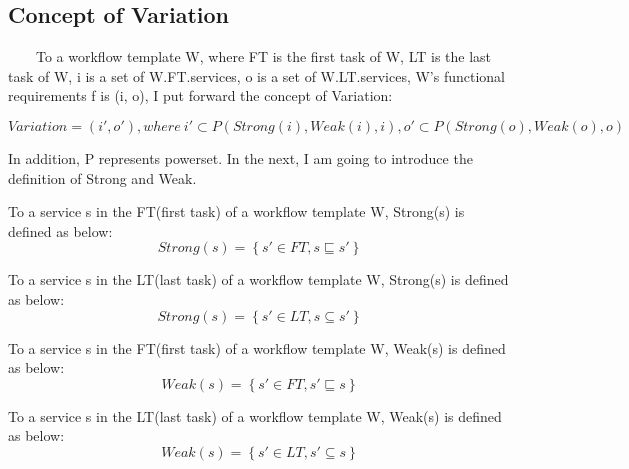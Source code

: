 \documentclass[senior,final,11pt]{iscs-thesis}
\begin{document}
\subsection{Concept of Variation}



~~~~To a workflow template W,  where  FT is the first task of W, LT is the last task of W, i is a set of W.FT.services, o is a set of W.LT.services, W's functional requirements f is (i, o), I put forward the concept of Variation:

\[Variation = (i', o'), where~i' \subset P(Strong(i), Weak(i), i),  o' \subset P(Strong(o), Weak(o), o)\]

In addition, P represents powerset. In the next, I am going to introduce the definition of Strong and Weak.


To a service s in the FT(first task) of a workflow template W, Strong(s) is defined as below:
\[Strong(s) = \left\{s' \in FT, s \sqsubseteq s'\right\}\]

To a service s in the LT(last task) of a workflow template W, Strong(s) is defined as below:
\[Strong(s) = \left\{s' \in LT, s \subseteq s'\right\}\]

To a service s in the FT(first task) of a workflow template W, Weak(s) is defined as below:
\[Weak(s) = \left\{s' \in FT, s' \sqsubseteq s\right\}\]

To a service s in the LT(last task) of a workflow template W, Weak(s) is defined as below:
\[Weak(s) = \left\{s' \in LT, s' \subseteq s\right\}\]

\end{document}
